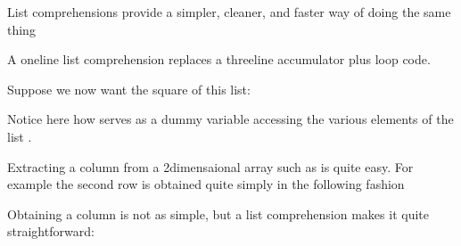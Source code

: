 \documentclass[letterpaper,10pt,english]{sphinxmanual}
\begin{document}
\sphinxAtStartPar
List comprehensions provide a simpler, cleaner, and faster way of doing the same thing

\begin{sphinxVerbatim}[commandchars=\\\{\}]
  \PYG{p}{[}\PYG{p}{[}\PYG{p}{]}\PYG{p}{[}\PYG{p}{]}    \PYG{p}{[}  \PYG{p}{]}\PYG{p}{]}

\PYG{p}{[}  \PYG{p}{]}
\end{sphinxVerbatim}

\sphinxAtStartPar
A one\sphinxhyphen{}line list comprehension replaces a three\sphinxhyphen{}line accumulator plus loop code.

\sphinxAtStartPar
Suppose we now want the square of this list:

\begin{sphinxVerbatim}[commandchars=\\\{\}]
\PYG{p}{[}    \PYG{p}{]}
\PYG{p}{[}  \PYG{p}{]}
\end{sphinxVerbatim}

\sphinxAtStartPar
Notice here how  serves as a dummy variable accessing the various elements of the list .

\sphinxAtStartPar
Extracting a column from a 2\sphinxhyphen{}dimensaional array such as  is quite easy.   For example the second row is obtained quite simply in the following fashion

\begin{sphinxVerbatim}[commandchars=\\\{\}]
\PYG{p}{[}\PYG{p}{]}
\PYG{p}{[}  \PYG{p}{]}
\end{sphinxVerbatim}

\sphinxAtStartPar
Obtaining a column is not as simple, but a list comprehension makes it quite straightforward:

\begin{sphinxVerbatim}[commandchars=\\\{\}]
  \PYG{p}{[}\PYG{p}{[}\PYG{p}{]}    \PYG{p}{]}
\PYG{p}{[}  \PYG{p}{]}
\end{sphinxVerbatim}
\end{document}
